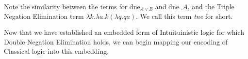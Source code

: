 \documentclass{article}
\begin{document}
Note the similarity between the terms for dne$_{A \lor B}$ and dne$_\lnot A$, and the Triple Negation Elimination term $\lambda k. \lambda a. k (\lambda q. q a)$. We call this term \textit{tne} for short.

\newpage

Now that we have established an embedded form of Intuituinistic logic for which Double Negation Elimination holds, we can begin mapping our encoding of Classical logic into this embedding.
\end{document}
